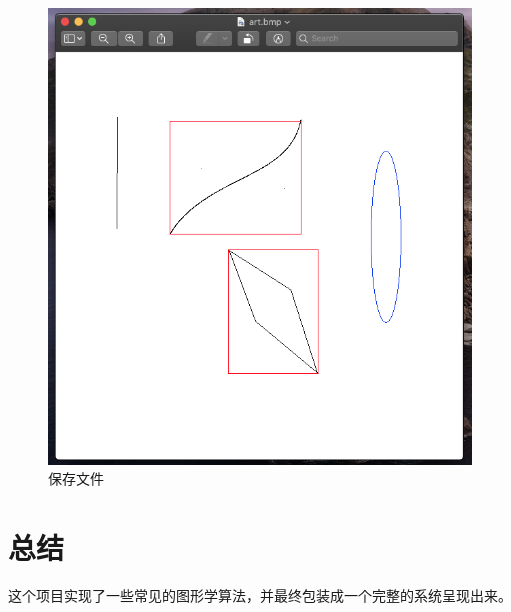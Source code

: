 \documentclass[a4paper,UTF8]{article}
\theoremstyle{definition}
\begin{document}
\begin{figure}[H]
    \centering
    \includegraphics[scale=0.4]{save.png}
    \caption{保存文件}
\end{figure}


\section{总结}

这个项目实现了一些常见的图形学算法，并最终包装成一个完整的系统呈现出来。

\newpage

%

\end{document}
